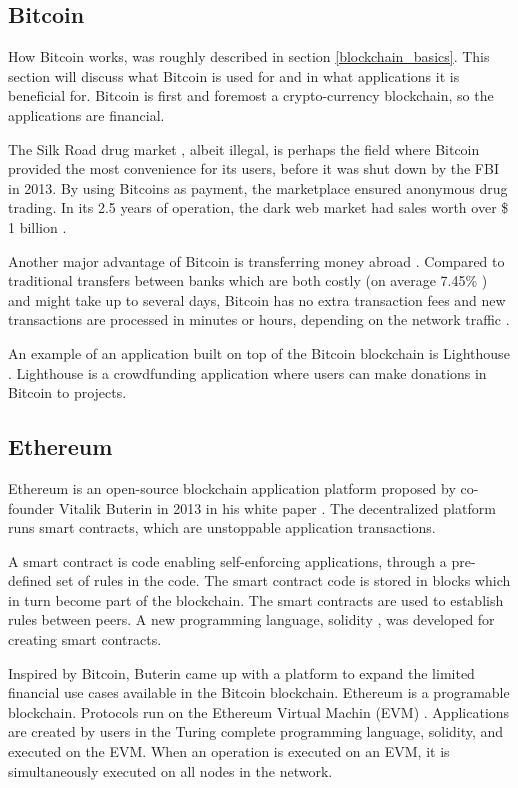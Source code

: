 \subsection{Bitcoin}
How Bitcoin works, was roughly described in section \ref{blockchain_basics}. This section will discuss what Bitcoin is used for and in what applications it is beneficial for. Bitcoin is first and foremost a crypto-currency blockchain, so the applications are financial.

The Silk Road drug market \cite{silk}, albeit illegal, is perhaps the field where Bitcoin provided the most convenience for its users, before it was shut down by the FBI in 2013. By using Bitcoins as payment, the marketplace ensured anonymous drug trading. In its 2.5 years of operation, the dark web market had sales worth over \$ 1 billion \cite{Ethereum_visions}.

Another major advantage of Bitcoin is transferring money abroad \cite{wirex}. Compared to traditional transfers between banks which are both costly (on average 7.45\% \cite{world_bank_group}) and might take up to several days, Bitcoin has no extra transaction fees and new transactions are processed in minutes or hours, depending on the network traffic \cite{transfer_time}. 

An example of an application built on top of the Bitcoin blockchain is Lighthouse \cite{lighthouse}. Lighthouse is a crowdfunding application where users can make donations in Bitcoin to projects. 

\subsection{Ethereum}
Ethereum is an open-source blockchain application platform \cite{ethereum.org} proposed by co-founder Vitalik Buterin \cite{Buterin} in 2013 in his white paper \cite{ether_white_paper}. The decentralized platform runs smart contracts, which are unstoppable application transactions.  

A smart contract is code enabling self-enforcing applications, through a pre-defined set of rules in the code. The smart contract code is stored in blocks which in turn become part of the blockchain. The smart contracts are used to establish rules between peers. A new programming language, solidity \cite{ethereum_docs}, was developed for creating smart contracts.

Inspired by Bitcoin, Buterin came up with a platform to expand the limited financial use cases available in the Bitcoin blockchain. Ethereum is a programable blockchain. Protocols run on the Ethereum Virtual Machin (EVM) \cite{ethereum_docs}. Applications are created by users in the Turing complete programming language, solidity, and executed on the EVM. When an operation is executed on an EVM, it is simultaneously executed on all nodes in the network.

